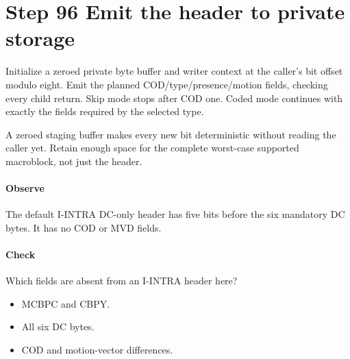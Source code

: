 \section{Step 96 Emit the header to private storage}\label{h263-syntax-s06}
Initialize a zeroed private byte buffer and writer context at the caller's bit
offset modulo eight. Emit the planned COD/type/presence/motion fields, checking
every child return. Skip mode stops after COD one. Coded mode continues with
exactly the fields required by the selected type.

A zeroed staging buffer makes every new bit deterministic without reading the
caller yet. Retain enough space for the complete worst-case supported macroblock,
not just the header.

\paragraph{Observe} The default I-INTRA DC-only header has five bits before the
six mandatory DC bytes. It has no COD or MVD fields.
\paragraph{Check} Which fields are absent from an I-INTRA header here?
\begin{itemize}
  \item[A.] MCBPC and CBPY.
  \item[B.] All six DC bytes.
  \item[C.] COD and motion-vector differences.
\end{itemize}
